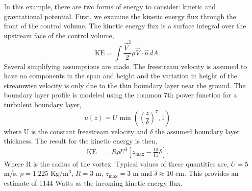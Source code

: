 In this example, there are two forms of energy to consider: kinetic and
gravitational potential. First, we examine the kinetic energy flux
through the front of the control volume. 
The kinetic energy flux is a surface integral over the upstream face of
the control volume,  
\begin{equation*}
\text{KE} = \int \frac{\vec V^2}{2} \rho \vec V \cdot \hat n \, dA.
\end{equation*}
%
%
Several simplifying assumptions are made. The freestream 
velocity is assumed to have no components in the span and height and
the variation in height of the streamwise
velocity is only due to the thin boundary layer near the
ground. The boundary layer profile is modeled using the common 7th
power function for a turbulent boundary layer,  
\begin{equation*}
  u(z) = U \text{ min }\left(\left(\frac{z}{\delta}\right)^7,1\right)
\end{equation*}
where U is the constant freestream velocity and $\delta$ the assumed
boundary layer thickness. 
The result for the kinetic energy is then, 
\begin{align*}
\text{KE} & = R \rho U^3 \left[ z_{\text{max}} - \frac{10}{11}\delta
\right].
\end{align*}
Where R is the radius of the vortex. Typical values of these quantities
are, $U = 5$ m/s, $\rho = 1.225$ Kg/$\text{m}^3$, $R = 3$ m,
$z_{\text{max}} = 3$ m and $\delta \approx 10$ cm. This provides an
estimate of 1144 Watts as the incoming kinetic energy flux. 

